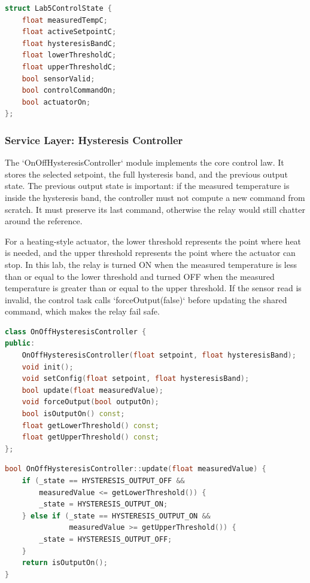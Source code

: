 \begin{lstlisting}[language=C++, caption=Shared state fields used by the control path, label=lst:shared_state_fields]
struct Lab5ControlState {
    float measuredTempC;
    float activeSetpointC;
    float hysteresisBandC;
    float lowerThresholdC;
    float upperThresholdC;
    bool sensorValid;
    bool controlCommandOn;
    bool actuatorOn;
};
\end{lstlisting}

\subsubsection{Service Layer: Hysteresis Controller}

The `OnOffHysteresisController` module implements the core control law. It stores the selected setpoint, the full hysteresis band, and the previous output state. The previous output state is important: if the measured temperature is inside the hysteresis band, the controller must not compute a new command from scratch. It must preserve its last command, otherwise the relay would still chatter around the reference.

For a heating-style actuator, the lower threshold represents the point where heat is needed, and the upper threshold represents the point where the actuator can stop. In this lab, the relay is turned ON when the measured temperature is less than or equal to the lower threshold and turned OFF when the measured temperature is greater than or equal to the upper threshold. If the sensor read is invalid, the control task calls `forceOutput(false)` before updating the shared command, which makes the relay fail safe.

\begin{lstlisting}[language=C++, caption=ON-OFF hysteresis controller interface, label=lst:hysteresis_header]
class OnOffHysteresisController {
public:
    OnOffHysteresisController(float setpoint, float hysteresisBand);
    void init();
    void setConfig(float setpoint, float hysteresisBand);
    bool update(float measuredValue);
    void forceOutput(bool outputOn);
    bool isOutputOn() const;
    float getLowerThreshold() const;
    float getUpperThreshold() const;
};
\end{lstlisting}

\begin{lstlisting}[language=C++, caption=Hysteresis state update, label=lst:hysteresis_update]
bool OnOffHysteresisController::update(float measuredValue) {
    if (_state == HYSTERESIS_OUTPUT_OFF &&
        measuredValue <= getLowerThreshold()) {
        _state = HYSTERESIS_OUTPUT_ON;
    } else if (_state == HYSTERESIS_OUTPUT_ON &&
               measuredValue >= getUpperThreshold()) {
        _state = HYSTERESIS_OUTPUT_OFF;
    }
    return isOutputOn();
}
\end{lstlisting}

